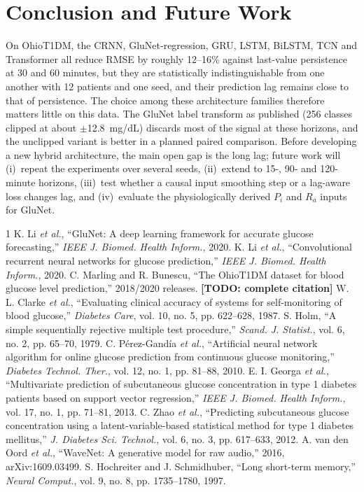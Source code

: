 \documentclass[conference]{IEEEtran}
\newcommand{\TODO}[1]{\textbf{[TODO: #1]}}
\begin{document}
\section{Conclusion and Future Work}
On OhioT1DM, the CRNN, GluNet-regression, GRU, LSTM, BiLSTM, TCN and Transformer all reduce RMSE by roughly 12--16\% against last-value persistence at 30 and 60 minutes, but they are statistically indistinguishable from one another with 12 patients and one seed, and their prediction lag remains close to that of persistence. The choice among these architecture families therefore matters little on this data. The GluNet label transform as published (256 classes clipped at about $\pm$12.8~mg/dL) discards most of the signal at these horizons, and the unclipped variant is better in a planned paired comparison. Before developing a new hybrid architecture, the main open gap is the long lag; future work will (i)~repeat the experiments over several seeds, (ii)~extend to 15-, 90- and 120-minute horizons, (iii)~test whether a causal input smoothing step or a lag-aware loss changes lag, and (iv)~evaluate the physiologically derived $P_i$ and $R_a$ inputs for GluNet.
\begin{thebibliography}{1}
 K. Li \emph{et al.}, ``GluNet: A deep learning framework for accurate glucose forecasting,'' \emph{IEEE J. Biomed. Health Inform.}, 2020.
 K. Li \emph{et al.}, ``Convolutional recurrent neural networks for glucose prediction,'' \emph{IEEE J. Biomed. Health Inform.}, 2020.
 C. Marling and R. Bunescu, ``The OhioT1DM dataset for blood glucose level prediction,'' 2018/2020 releases. \TODO{complete citation}
 W. L. Clarke \emph{et al.}, ``Evaluating clinical accuracy of systems for self-monitoring of blood glucose,'' \emph{Diabetes Care}, vol. 10, no. 5, pp. 622--628, 1987.
 S. Holm, ``A simple sequentially rejective multiple test procedure,'' \emph{Scand. J. Statist.}, vol. 6, no. 2, pp. 65--70, 1979.
 C. P\'erez-Gand\'ia \emph{et al.}, ``Artificial neural network algorithm for online glucose prediction from continuous glucose monitoring,'' \emph{Diabetes Technol. Ther.}, vol. 12, no. 1, pp. 81--88, 2010.
 E. I. Georga \emph{et al.}, ``Multivariate prediction of subcutaneous glucose concentration in type 1 diabetes patients based on support vector regression,'' \emph{IEEE J. Biomed. Health Inform.}, vol. 17, no. 1, pp. 71--81, 2013.
 C. Zhao \emph{et al.}, ``Predicting subcutaneous glucose concentration using a latent-variable-based statistical method for type 1 diabetes mellitus,'' \emph{J. Diabetes Sci. Technol.}, vol. 6, no. 3, pp. 617--633, 2012.
 A. van den Oord \emph{et al.}, ``WaveNet: A generative model for raw audio,'' 2016, arXiv:1609.03499.
 S. Hochreiter and J. Schmidhuber, ``Long short-term memory,'' \emph{Neural Comput.}, vol. 9, no. 8, pp. 1735--1780, 1997.
\end{thebibliography}
\end{document}
